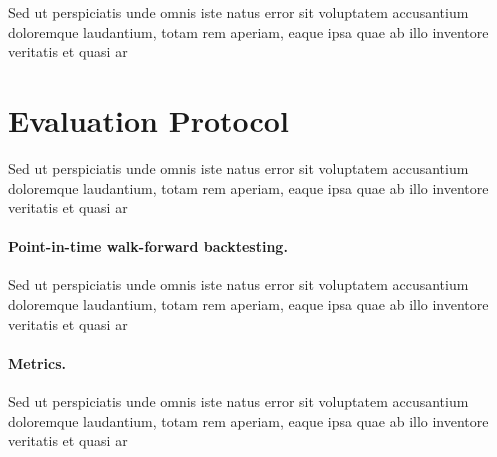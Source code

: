 Sed ut perspiciatis unde omnis iste natus error sit voluptatem accusantium doloremque laudantium, totam rem aperiam, eaque ipsa quae ab illo inventore veritatis et quasi ar

\section{Evaluation Protocol}

Sed ut perspiciatis unde omnis iste natus error sit voluptatem accusantium doloremque laudantium, totam rem aperiam, eaque ipsa quae ab illo inventore veritatis et quasi ar

\paragraph{Point-in-time walk-forward backtesting.}

Sed ut perspiciatis unde omnis iste natus error sit voluptatem accusantium doloremque laudantium, totam rem aperiam, eaque ipsa quae ab illo inventore veritatis et quasi ar

\paragraph{Metrics.}

Sed ut perspiciatis unde omnis iste natus error sit voluptatem accusantium doloremque laudantium, totam rem aperiam, eaque ipsa quae ab illo inventore veritatis et quasi ar